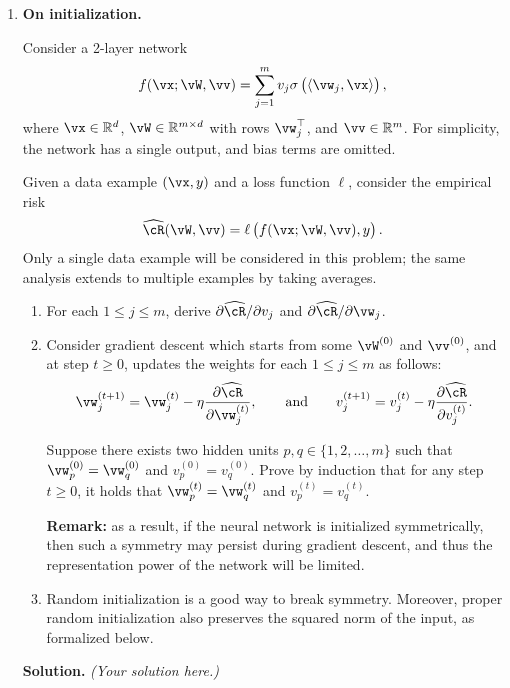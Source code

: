 \documentclass{article}
\def\hcR{\widehat{\cR}}
\theoremstyle{definition}
\theoremstyle{remark}
\newenvironment{Q}
{%
\clearpage
\item
}
{%
\phantom{s}
\bigskip
\textbf{Solution.}
\emph{(Your solution here.)}
}
\begin{document}
\begin{enumerate}
\begin{Q}
    \textbf{On initialization.}

    Consider a 2-layer network
    \begin{align*}
        f(\vx;\vW,\vv)=\sum_{j=1}^{m}v_j\sigma\del{\langle\vw_j,\vx\rangle},
    \end{align*}
    where $\vx\in \mathbb{R}^d$, $\vW\in \mathbb{R}^{m\times d}$ with rows $\vw_j^\top$, and $\vv\in \mathbb{R}^m$. For simplicity, the network has a single output, and bias terms are omitted.

    Given a data example $(\vx,y)$ and a loss function $\ell$, consider the empirical risk
    \begin{align*}
        \hcR(\vW,\vv)=\ell\del{f(\vx;\vW,\vv),y}.
    \end{align*}
    Only a single data example will be considered in this problem;
    the same analysis extends to multiple examples by taking averages.

    \begin{enumerate}
        \item For each $1\le j\le m$, derive $\partial\hcR/\partial v_j$ and $\partial\hcR/\partial \vw_j$.

        \item Consider gradient descent which starts from some $\vW^{(0)}$ and $\vv^{(0)}$, and at step $t\ge0$, updates the weights for each $1\le j\le m$ as follows:
        \begin{align*}
            \vw_j^{(t+1)}=\vw_j^{(t)}-\eta \frac{\partial\hcR}{\partial \vw_j^{(t)}},\qquad \mathrm{and}\qquad v_j^{(t+1)}=v_j^{(t)}-\eta \frac{\partial\hcR}{\partial v_j^{(t)}}.
        \end{align*}

        Suppose there exists two hidden units $p,q\in\{1,2,\ldots,m\}$ such that $\vw_p^{(0)}=\vw_q^{(0)}$ and $v_p^{(0)}=v_q^{(0)}$. Prove by induction that for any step $t\ge0$, it holds that $\vw_p^{(t)}=\vw_q^{(t)}$ and $v_p^{(t)}=v_q^{(t)}$.

        \textbf{Remark:} as a result, if the neural network is initialized symmetrically, then such a symmetry may persist during gradient descent, and thus the representation power of the network will be limited.

        \item Random initialization is a good way to break symmetry. Moreover, proper random initialization also preserves the squared norm of the input, as formalized below.


\end{enumerate}
\end{Q}
\end{enumerate}
\end{document}
